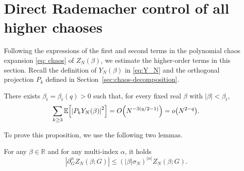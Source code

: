 \documentclass[../CLT_SYK.tex]{subfiles}
\begin{document}
\section{Direct Rademacher control of all higher chaoses} \label{sec:Rademacher-remainder}

Following the expressions of the first and second terms in the polynomial chaos expansion \eqref{eq: chaos} of $Z_N(\beta)$,
we estimate the higher-order terms in this section. Recall the definition of $Y_N(\beta)$ in \eqref{eq:Y_N} and the orthogonal projection $P_k$ defined in Section~\ref{sec:chaos-decomposition}.

\begin{proposition} \label{prop:higher-chaos-closure}
  There exists $\beta_{\mathrm{r}}=\beta_{\mathrm{r}}(q)>0$ such that, for every fixed real $\beta$ with $|\beta|<\beta_{\mathrm{r}}$,
  \begin{equation*}
    \sum_{k \geq 3}
    \E\mleft[\left|P_k Y_N(\beta)\right|^2\mright]
    =
      O\mleft(N^{-3(q/2-1)}\mright)
    =
      o\mleft(N^{2-q}\mright).
  \end{equation*}
\end{proposition}

To prove this proposition, we use the following two lemmas.

\begin{lemma} \label{lem:Z-derivative-bound}
  For any $\beta\in \mathbb R$ and for any multi-index $\alpha$, it holds 
  \begin{equation}\label{eq:Z-derivative-bound}
    \left|\partial_G^\alpha Z_N(\beta;G)\right|
    \leq (|\beta|\sigma_N)^{|\alpha|} Z_N(\beta;G).
  \end{equation}
\end{lemma}
\end{document}
